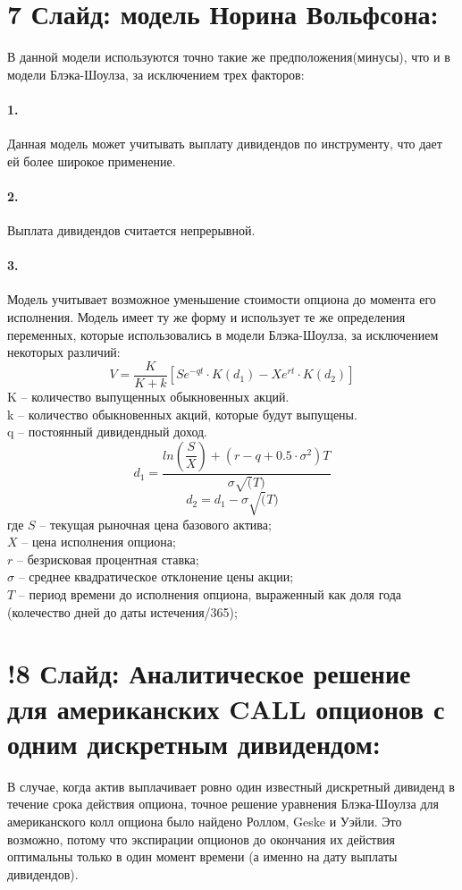 \documentclass[a4paper]{article}
\begin{document}
\section*{7 Слайд: модель Норина Вольфсона:}
В данной модели используются точно такие же предположения(минусы), что и в модели Блэка-Шоулза, за исключением трех факторов:
\paragraph*{1.} Данная модель может учитывать выплату дивидендов по инструменту, что дает ей более широкое применение.
\paragraph*{2.} Выплата дивидендов считается непрерывной.
\paragraph*{3.} Модель учитывает возможное уменьшение стоимости опциона до момента его исполнения.
Модель имеет ту же форму и использует те же определения переменных, которые использовались в модели Блэка-Шоулза, за исключением некоторых различий:
\[V = \dfrac{K}{K+k} \left[ Se^{-qt} \cdot K(d_1) - Xe^{rt} \cdot K(d_2)\right]\]
K -- количество выпущенных обыкновенных акций. \\
k -- количество обыкновенных акций, которые будут выпущены.\\
q -- постоянный дивидендный доход.
\[d_1 = \dfrac{ ln \left( \dfrac{S}{X} \right) + (r - q + 0.5 \cdot \sigma^2) T}{\sigma \sqrt(T)}\]
\[d_2 = d_1 - \sigma \sqrt(T)\]
где $S$ -- текущая рыночная цена базового актива; \\
$X$ – цена исполнения опциона; \\ 
$r$ -- безрисковая процентная ставка; \\
$\sigma$ -- среднее квадратическое отклонение цены акции; \\
$T$ -- период времени до исполнения опциона, выраженный как доля года (колечество дней до даты истечения/365);

\section*{!8 Слайд: Аналитическое решение для американских CALL опционов с одним дискретным дивидендом:}
В случае, когда актив выплачивает ровно один известный дискретный дивиденд в течение срока действия опциона, точное решение уравнения Блэка-Шоулза для американского колл опциона было найдено Роллом, Geske и Уэйли. Это возможно, потому что экспирации опционов до окончания их действия оптимальны только в один момент времени (а именно на дату выплаты дивидендов).
\end{document}

